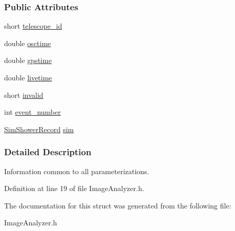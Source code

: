\subsubsection*{Public Attributes}
\begin{DoxyCompactItemize}
\item 
\hypertarget{structImageParameterization_a7190a3fc893a52c1f544d34b09c0368f}{
short \hyperlink{structImageParameterization_a7190a3fc893a52c1f544d34b09c0368f}{telescope\_\-id}}
\label{structImageParameterization_a7190a3fc893a52c1f544d34b09c0368f}

\item 
\hypertarget{structImageParameterization_a3d8a18d1b4e1bf7d7f5b177665651cf4}{
double \hyperlink{structImageParameterization_a3d8a18d1b4e1bf7d7f5b177665651cf4}{osctime}}
\label{structImageParameterization_a3d8a18d1b4e1bf7d7f5b177665651cf4}

\item 
\hypertarget{structImageParameterization_a169f947f6ed26a3097243c8c42c41a64}{
double \hyperlink{structImageParameterization_a169f947f6ed26a3097243c8c42c41a64}{gpstime}}
\label{structImageParameterization_a169f947f6ed26a3097243c8c42c41a64}

\item 
\hypertarget{structImageParameterization_a485ec7c0550f9214971331a7cc2b0b6c}{
double \hyperlink{structImageParameterization_a485ec7c0550f9214971331a7cc2b0b6c}{livetime}}
\label{structImageParameterization_a485ec7c0550f9214971331a7cc2b0b6c}

\item 
\hypertarget{structImageParameterization_a413610cc7481fd731c8b6a0e30d741a0}{
short \hyperlink{structImageParameterization_a413610cc7481fd731c8b6a0e30d741a0}{invalid}}
\label{structImageParameterization_a413610cc7481fd731c8b6a0e30d741a0}

\item 
\hypertarget{structImageParameterization_a3524379a51b511ce132fb97d66e6028b}{
int \hyperlink{structImageParameterization_a3524379a51b511ce132fb97d66e6028b}{event\_\-number}}
\label{structImageParameterization_a3524379a51b511ce132fb97d66e6028b}

\item 
\hypertarget{structImageParameterization_a87de679fb2937a5f1efe38b2c68dea44}{
\hyperlink{structSimShowerRecord}{SimShowerRecord} \hyperlink{structImageParameterization_a87de679fb2937a5f1efe38b2c68dea44}{sim}}
\label{structImageParameterization_a87de679fb2937a5f1efe38b2c68dea44}

\end{DoxyCompactItemize}


\subsubsection{Detailed Description}
Information common to all parameterizations. 

Definition at line 19 of file ImageAnalyzer.h.



The documentation for this struct was generated from the following file:\begin{DoxyCompactItemize}
\item 
ImageAnalyzer.h\end{DoxyCompactItemize}
